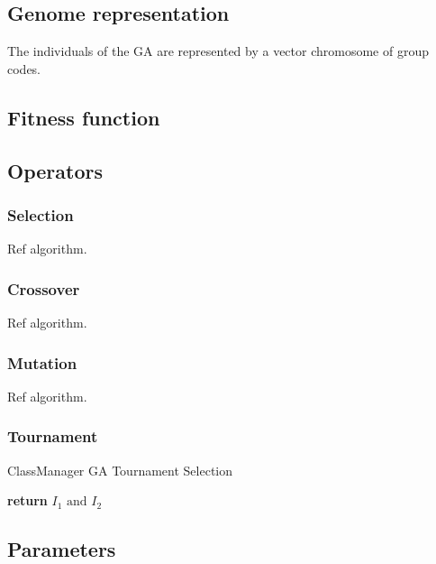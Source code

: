 \subsection{Genome representation}

The individuals of the GA are represented by a vector chromosome of group codes.

\subsection{Fitness function}

\subsection{Operators}

\subsubsection{Selection}

Ref algorithm.

\subsubsection{Crossover}

Ref algorithm.

\subsubsection{Mutation}

Ref algorithm.

\subsubsection{Tournament}

\begin{algorithm}[H]
    \caption{ClassManager GA Tournament Selection}
    \begin{algorithmic}[1]
            \State \textbf{return} $I_{1} \text{ and } I_{2}$
        \EndProcedure
    \end{algorithmic}
\end{algorithm}

\subsection{Parameters}



